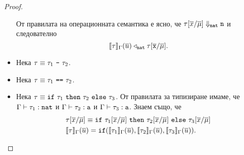 \begin{proof}
\begin{itemize}
    От правилата на операционната семантика е ясно, че $\tau[\overline{x}/\overline{\mu}] \Downarrow_{\texttt{nat}} \texttt{n}$ и следователно
    \[\llbracket{\tau}\rrbracket_\Gamma(\overline{u}) \triangleleft_{\texttt{nat}} \tau[\overline{\texttt{x}}/\overline{\mu}].\]
  \item
    Нека $\tau \equiv \tau_1\ \vv{-}\ \tau_2$. 
  \item
    Нека $\tau \equiv \tau_1\ \vv{==}\ \tau_2$. 
  \item
    Нека $\tau \equiv \texttt{if}\ \tau_1\ \texttt{then}\ \tau_2\ \texttt{else}\ \tau_3$.
    От правилата за типизиране имаме, че $\Gamma \vdash \tau_1 : \texttt{nat}$ и
    $\Gamma \vdash \tau_2 : \texttt{a}$ и $\Gamma \vdash \tau_3 : \texttt{a}$.
    Знаем също, че
    \begin{align*}
      & \tau[\overline{x}/\overline{\mu}] \equiv \texttt{if}\ \tau_1[\overline{x}/\overline{\mu}]\ \texttt{then}\ \tau_2[\overline{x}/\overline{\mu}]\ \texttt{else}\ \tau_3[\overline{x}/\overline{\mu}]\\
      & \llbracket{\tau}\rrbracket_\Gamma(\overline{u}) = \texttt{if}(\llbracket{\tau_1}\rrbracket_\Gamma(\overline{u}),\llbracket{\tau_2}\rrbracket_\Gamma(\overline{u}),\llbracket{\tau_3}\rrbracket_\Gamma(\overline{u})).
    \end{align*}


\end{itemize}
\end{proof}
